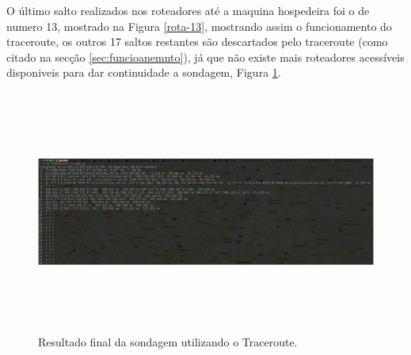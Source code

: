 \documentclass[
	article,			%
	11pt,				%
	oneside,			%
	a4paper,			%
	english,			%
	brazil,				%
	sumario=tradicional
	]{abntex2}
\begin{document}
	O último salto realizados nos roteadores até a maquina hospedeira foi o de numero 13, mostrado na Figura \ref{rota-13}, mostrando assim o funcionamento do traceroute, os outros 17 saltos restantes são descartados pelo traceroute (como citado na secção \ref{sec:funcioanemnto}), já que não existe mais roteadores acessíveis disponiveis para dar continuidade a sondagem, Figura \ref{traceroute}.
	
\begin{figure}[H]
	\centering
	\includegraphics[width=15cm,height=8cm]{./trauceroute-1.png}
	\caption{Resultado final da sondagem utilizando o Traceroute.}
	\label{traceroute}
\end{figure}
	 
\end{document}
